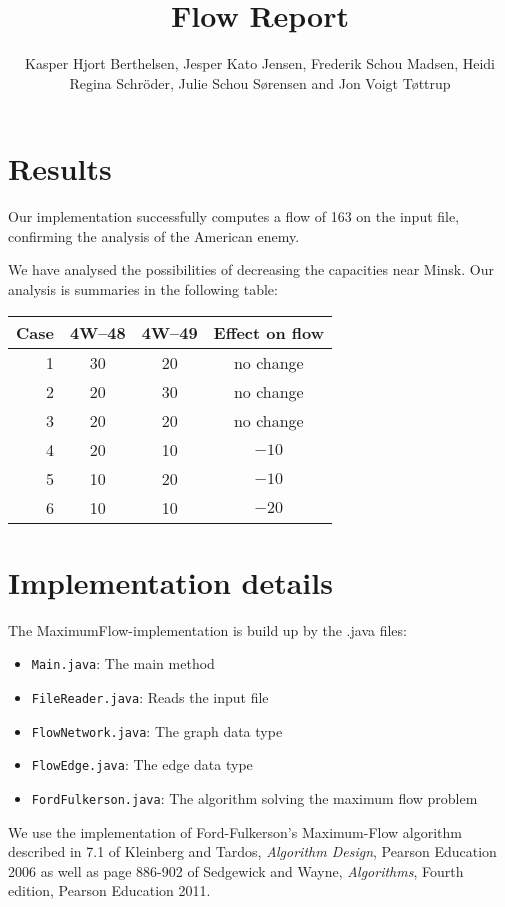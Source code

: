 \documentclass{tufte-handout}
\title{Flow Report}
\author{Kasper Hjort Berthelsen, Jesper Kato Jensen, Frederik Schou Madsen, Heidi Regina Schröder, Julie Schou Sørensen and Jon Voigt Tøttrup}
\begin{document}
  \maketitle

  \section{Results}

  Our implementation successfully computes a flow of 163 on the input file, confirming the analysis of the American enemy.

  We have analysed the possibilities of decreasing the capacities near Minsk.
  Our analysis is summaries in the following table:

\bigskip
  \begin{tabular}{rccc}\toprule
    Case & 4W--48 & 4W--49 & Effect on flow \\\midrule
    1& 30& 20 & no change \\
    2& 20 &30 & no change \\
    3&20 & 20& no change \\
    4& 20 & 10 & $-10$\\
    5& 10 & 20 & $-10$\\
    6& 10 & 10 & $-20$\\
    \bottomrule
  \end{tabular}


\section{Implementation details}

The MaximumFlow-implementation is build up by the .java files:

\begin{itemize}[-]
\setlength\itemsep{0em}
\item \verb#Main.java#: The main method
\item \verb#FileReader.java#: Reads the input file
\item \verb#FlowNetwork.java#: The graph data type
\item \verb#FlowEdge.java#: The edge data type
\item \verb#FordFulkerson.java#: The algorithm solving the maximum flow problem
\end{itemize}


We use the implementation of Ford-Fulkerson's Maximum-Flow algorithm described in 7.1 of Kleinberg and Tardos, \emph{Algorithm Design}, Pearson Education 2006 as well as page 886-902 of Sedgewick and Wayne, \emph{Algorithms}, Fourth edition, Pearson Education 2011. 
\end{document}

